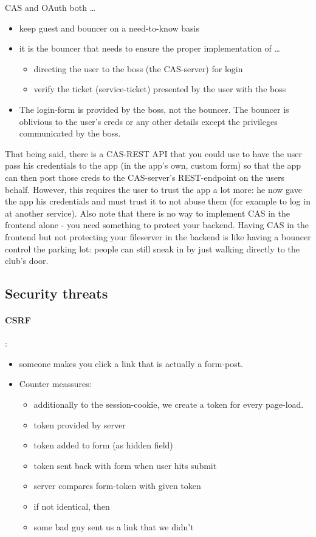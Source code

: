CAS and OAuth both \dots
\begin{itemize}
     \item keep guest and bouncer on a need-to-know basis
     \item it is the bouncer that needs to ensure the proper implementation of \dots \begin{itemize}
          \item directing the user to the boss (the CAS-server) for login
          \item verify the ticket (service-ticket) presented by the user with the boss
     \end{itemize}
     \item The login-form is provided by the boss, not the bouncer. The bouncer is oblivious to the user's creds or any other details except the privileges communicated by the boss.
\end{itemize}

That being said, there is a CAS-REST API that you could use to have the user pass his credentials to the app (in the app's own, custom form) so that the app can then post those creds to the CAS-server's REST-endpoint on the users behalf. However, this requires the user to trust the app a lot more: he now gave the app his credentials and must trust it to not abuse them (for example to log in at another service).
Also note that there is no way to implement CAS in the frontend alone - you need something to protect your backend. Having CAS in the frontend but not protecting your fileserver in the backend is like having a bouncer control the parking lot: people can still sneak in by just walking directly to the club's door.

\subsection{Security threats}


\paragraph{CSRF}:
\begin{itemize}
     \item someone makes you click a link that is actually a form-post.
     \item Counter meassures: \begin{itemize}
          \item additionally to the session-cookie, we create a token for every page-load.
          \item token provided by server
          \item token added to form (as hidden field)
          \item token sent back with form when user hits submit
          \item server compares form-token with given token
          \item if not identical, then 
          \item some bad guy sent us a link that we didn't
     \end{itemize}
\end{itemize}


